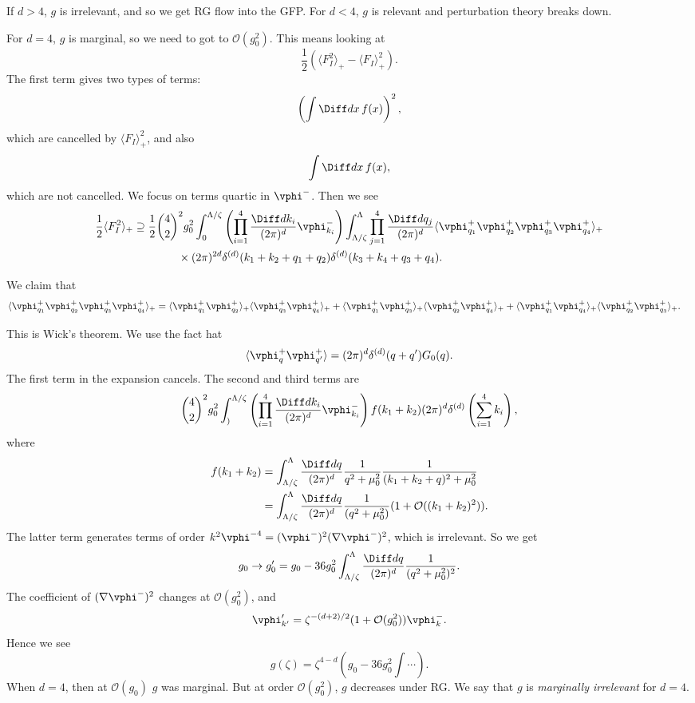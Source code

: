 \documentclass[12pt]{article}
\begin{document}
If $d > 4$, $g$ is irrelevant, and so we get RG flow into the GFP. For $d < 4$, $g$ is relevant and perturbation theory breaks down.

For $d = 4$, $g$ is marginal, so we need to got to $\mathcal{O}(g_0^2)$. This means looking at
\[
\frac{1}{2} ( \langle F_I^2 \rangle_+ - \langle F_I \rangle_+^2 ).
\]
The first term gives two types of terms:
\[
\left( \int \Diff d x \, f(x) \right)^2,
\]
which are cancelled by $\langle F_I \rangle_+^2$, and also
\[
\int \Diff d  x\, f(x),
\]
which are not cancelled. We focus on terms quartic in $\vphi^{-}$. Then we see
\begin{align*}
	\frac{1}{2} \langle F_I^2\rangle_+ &\supseteq \frac{1}{2} \binom 42 ^2 g_0^2 \int_0^{\Lambda/\zeta} \left( \prod_{i = 1}^4 \frac{\Diff d k_i}{(2 \pi)^{d}} \vphi_{k_i}^{-} \right) \int_{\Lambda/\zeta}^{\Lambda} \prod_{j=1}^{4} \frac{\Diff d q_j}{(2 \pi)^{d}} \langle \vphi^{+}_{q_1} \vphi^{+}_{q_2} \vphi^{+}_{q_3} \vphi^{+}_{q_4} \rangle_+ \\
					   & \qquad \qquad \times (2 \pi)^{2d} \delta^{(d)}(k_1 + k_2 + q_1 + q_2) \delta^{(d)}(k_3 + k_4 + q_3 + q_4).
\end{align*}

We claim that
\begin{align*}
	\langle \vphi^{+}_{q_1} \vphi^{+}_{q_2} \vphi^{+}_{q_3} \vphi^{+}_{q_4} \rangle_+ &= \langle \vphi_{q_1}^+ \vphi_{q_2}^+ \rangle_+\langle \vphi_{q_3}^+ \vphi_{q_4}^+ \rangle_+ + \langle \vphi_{q_1}^+ \vphi_{q_3}^+ \rangle_+\langle \vphi_{q_2}^+ \vphi_{q_4}^+ \rangle_+ + \langle \vphi_{q_1}^+ \vphi_{q_4}^+ \rangle_+\langle \vphi_{q_2}^+ \vphi_{q_3}^+ \rangle_+.
\end{align*}

This is Wick's theorem. We use the fact hat
\[
\langle \vphi_q^{+} \vphi_{q'}^+ \rangle = (2 \pi)^{d} \delta^{(d)}(q + q') G_0(q).
\]
The first term in the expansion cancels. The second and third terms are
\[
	\binom 42 ^2 g_0^2 \int_{)}^{\Lambda/\zeta} \left( \prod_{i = 1}^4 \frac{\Diff d k_i}{(2 \pi)^{d}} \vphi_{k_i}^{-} \right) f(k_1 + k_2)(2 \pi)^{d} \delta^{(d)} \left( \sum_{i =1}^4 k_i \right),
\]
where
\begin{align*}
	f(k_1 + k_2) &= \int_{\Lambda /\zeta} ^{\Lambda} \frac{\Diff d q}{(2 \pi)^{d}} \frac{1}{q^2 + \mu_0^2} \frac{1}{(k_1 + k_2 + q)^2 + \mu_0^2} \\
		     &= \int_{\Lambda /\zeta} ^{\Lambda} \frac{\Diff d q}{(2 \pi)^{d}} \frac{1}{(q^2 + \mu_0^2)} (1 + \mathcal{O}((k_1 + k_2)^2)).
\end{align*}
The latter term generates terms of order $k^2 \vphi^{-4} = (\vphi^{-})^2(\nabla \vphi^{-})^2$, which is irrelevant. So we get
\[
g_0 \to g_0' = g_0 - 36 g_0^2 \int_{\Lambda/\zeta}^{\Lambda} \frac{\Diff d q}{(2 \pi)^{d}} \frac{1}{(q^2 + \mu_0^2)^2}.
\]
The coefficient of $(\nabla \vphi^{-})^2$ changes at $\mathcal{O}(g_0^2)$, and
\[
\vphi_{k'}' = \zeta^{-(d+2)/2}(1 + \mathcal{O}(g_0^2)) \vphi_{k}^{-}.
\]
Hence we see
\[
	g(\zeta) = \zeta^{4- d} \left( g_0 - 36 g_0^2 \int \cdots \right).
\]
When $d = 4$, then at $\mathcal{O}(g_0)$ $g$ was marginal. But at order $\mathcal{O}(g_0^2)$, $g$ decreases under RG. We say that $g$ is \emph{marginally irrelevant} for $d = 4$.
\end{document}
